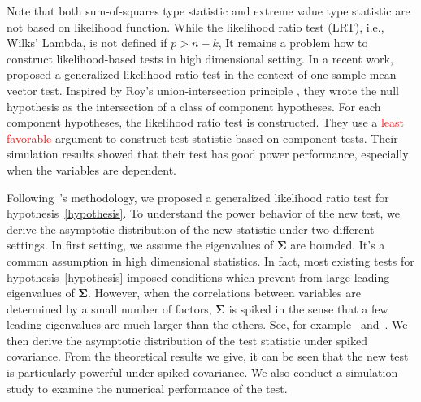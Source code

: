 \documentclass[12pt]{article} %
\newcommand{\bfsym}[1]{\ensuremath{\boldsymbol{#1}}}
\def\bSigma {\bfsym {\Sigma}}
\theoremstyle{definition}
\begin{document}
   Note that both sum-of-squares type statistic and extreme value type statistic are not based on likelihood function.
    While the likelihood ratio test (LRT), i.e., Wilks' Lambda, is not defined if $p>n-k$,
    It remains a problem how to construct likelihood-based tests in high dimensional setting.
    In a recent work,~\cite{Zhao2016A} proposed a generalized likelihood ratio test in the context of one-sample mean vector test.
Inspired by Roy's union-intersection principle \citep{Roy1953},
    they wrote the null hypothesis as the intersection of a class of component hypotheses.
    For each component hypotheses, the likelihood ratio test is constructed.
    They use a \textcolor{red}{least favorable} argument to construct test statistic based on component tests.
    Their simulation results showed that their test has good power performance, especially when the variables are dependent.

    Following~\cite{Zhao2016A}'s methodology, we proposed a generalized likelihood ratio test for hypothesis~\eqref{hypothesis}.
    To understand the power behavior of the new test, we derive the asymptotic distribution of the new statistic under two different settings.
    In first setting, we assume the eigenvalues of $\bSigma$ are bounded.
    It's a common assumption in high dimensional statistics.
    In fact, most existing tests for hypothesis~\eqref{hypothesis} imposed conditions which prevent from large leading eigenvalues of $\bSigma$.
    However, when the correlations between variables are determined by a small number of factors, $\bSigma$ is spiked in the sense that a few leading eigenvalues are much larger than the others.
    See, for example~\cite{Cai2012Sparse} and~\cite{Shen2013Consistency}.
    We then derive the asymptotic distribution of the test statistic under spiked covariance.
    From the theoretical results we give, it can be seen that the new test is particularly powerful under spiked covariance.
    We also conduct a simulation study to examine the numerical performance of the test.
\end{document}
